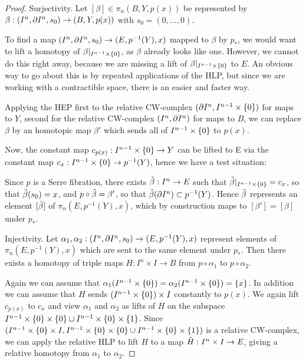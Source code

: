\begin{proof}
Surjectivity. Let $[\beta]\in\pi_n(B,Y,p(x))$ be represented by $\beta:(I^n,\partial I^n,s_0)\to(B,Y,p(x))$ with $s_0=(0,\dots,0)$.


To find a map $(I^n,\partial I^n,s_0)\to(E,p^{-1}(Y),x)$ mapped to $\beta$ by $p_*$, we would want to lift a homotopy of $\beta|_{I^{n-1}\times\{0\}}$, as $\beta$ already looks like one. However, we cannot do this right away, because we are missing a lift of $\beta|_{I^{n-1}\times\{0\}}$ to $E$. An obvious way to go about this is by repeated applications of the HLP, but since we are working with a contractible space, there is an easier and faster way.

Applying the HEP first to the relative CW-complex $(\partial I^n,I^{n-1}\times\{0\})$ for maps to $Y$, second for the relative CW-complex $(I^n,\partial I^n)$ for maps to $B$, we can replace $\beta$ by an homotopic map $\beta'$ which sends all of $I^{n-1}\times\{0\}$ to $p(x)$.



Now, the constant map $c_{p(x)}:I^{n-1}\times\{0\}\to Y$ can be lifted to E via the constant map $c_x:I^{n-1}\times\{0\}\to p^{-1}(Y)$, hence we have a test situation:
\begin{center}
\end{center}
Since $p$ is a Serre fibration, there exists $\tilde\beta:I^n\to E$ such that $\tilde\beta|_{I^{n-1}\times\{0\}}=c_x$, so that $\tilde\beta(s_0)=x$, and $p\circ\tilde\beta=\beta'$, so that $\tilde\beta(\partial I^n)\subset p^{-1}(Y)$. Hence $\tilde\beta$ represents an element $[\tilde\beta]$ of $\pi_n(E,p^{-1}(Y),x)$, which by construction maps to $[\beta']=[\beta]$ under $p_*$.

Injectivity. Let $\alpha_1,\alpha_2:(I^n,\partial I^n,s_0)\to(E,p^{-1}(Y),x)$ represent elements of $\pi_n(E,p^{-1}(Y),x)$ which are sent to the same element under $p_*$. Then there exists a homotopy of triple maps $H:I^n\times I\to B$ from $p\circ\alpha_1$ to $p\circ\alpha_2$.



Again we can assume that $\alpha_1(I^{n-1}\times\{0\})=\alpha_2(I^{n-1}\times\{0\})=\{x\}$. In addition we can assume that $H$ sends $(I^{n-1}\times\{0\})\times I$ constantly to $p(x)$. We again lift $c_{p(x)}$ to $c_x$ and view $\alpha_1$ and $\alpha_2$ as lifts of $H$ on the subspace $I^{n-1}\times\{0\}\times\{0\}\cup I^{n-1}\times\{0\}\times\{1\}$. Since $(I^{n-1}\times\{0\}\times I,I^{n-1}\times\{0\}\times\{0\}\cup I^{n-1}\times\{0\}\times\{1\})$ is a relative CW-complex, we can apply the relative HLP to lift $H$ to a map $\tilde H:I^n\times I\to E$, giving a relative homotopy from $\alpha_1$ to $\alpha_2$.
\end{proof}

